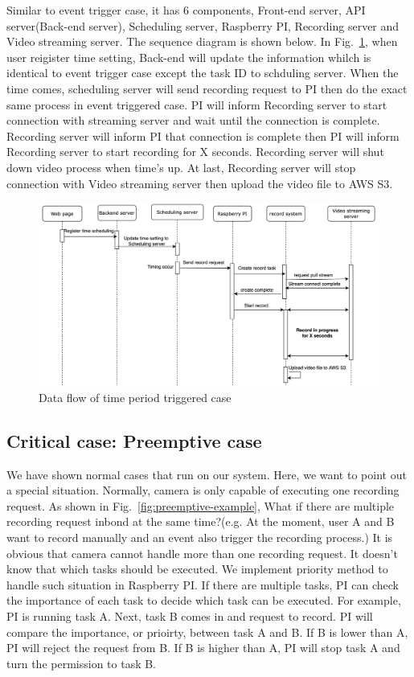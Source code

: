 Similar to event trigger case, it has 6 components, Front-end server, API server(Back-end server), Scheduling server, Raspberry PI, Recording server and Video streaming server. The sequence diagram is shown below. In Fig.~\ref{fig:time-sequence-diagram}, when user reigister time setting, Back-end will update the information whilch is identical to event trigger case except the task ID to schduling server. When the time comes, scheduling server will send recording request to PI then do the exact same process in event triggered case. PI will inform Recording server to start connection with streaming server and wait until the connection is complete. Recording server will inform PI that connection is complete then PI will inform Recording server to start recording for X seconds. Recording server will shut down video process when time's up. At last, Recording server will stop connection with Video streaming server then upload the video file to AWS S3.

\begin{figure}[H]
    \centering
    \includegraphics[width=\textwidth]{figsrc/time-sequence-diagram.png}
    \caption{Data flow of time period triggered case\label{fig:time-sequence-diagram}}
\end{figure}

\subsection{Critical case: Preemptive case}
We have shown normal cases that run on our system. Here, we want to point out a special situation. Normally, camera is only capable of executing one recording request. As shown in Fig.~\ref{fig:preemptive-example}, What if there are multiple recording request inbond at the same time?(e.g. At the moment, user A and B want to record manually and an event also trigger the recording process.) It is obvious that camera cannot handle more than one recording request. It doesn't know that which tasks should be executed. We implement priority method to handle such situation in Raspberry PI. If there are multiple tasks, PI can check the importance of each task to decide which task can be executed. For example, PI is running task A. Next, task B comes in and request to record. PI will compare the importance, or prioirty, between task A and B. If B is lower than A, PI will reject the request from B. If B is higher than A, PI will stop task A and turn the permission to task B.


